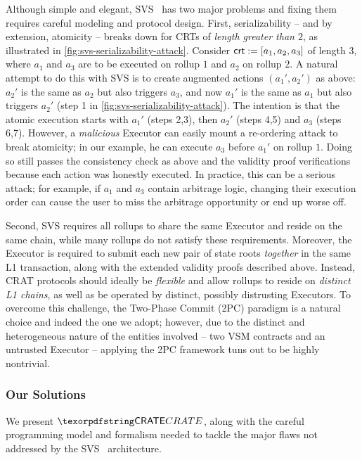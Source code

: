 Although simple and elegant, SVS~\cite{shared-val-seq-23} has two major problems and fixing them requires careful modeling and protocol design. 
First, serializability -- and by extension, atomicity -- breaks down for CRTs of \emph{length greater than $2$}, as illustrated in \cref{fig:svs-serializability-attack}.
Consider $\mathsf{crt} := [a_1, a_2, a_3]$ of length $3$, where $a_1$ and $a_3$ are to be executed on rollup $1$ and $a_2$ on rollup $2$. A natural attempt to do this with SVS is to create augmented actions $(a_1', a_2')$ as above: $a_2'$ is the same as $a_2$ but also triggers $a_3$, and now $a_1'$ is the same as $a_1$ but also triggers $a_2'$ (step 1 in \cref{fig:svs-serializability-attack}).
The intention is that the atomic execution starts with $a_1'$ (steps 2,3), then $a_2'$ (steps 4,5) and $a_3$ (steps 6,7). 
However, a \textit{malicious} Executor can easily mount a re-ordering attack to break atomicity; in our example, he can execute $a_3$ before $a_1'$ on rollup $1$. 
Doing so still passes the consistency check as above and the validity proof verifications because each action was honestly executed. In practice, this can be a serious attack; for example, if $a_1$ and $a_3$ contain arbitrage logic, changing their execution order can cause the user to miss the arbitrage opportunity or end up worse off. 








Second, SVS requires all rollups to share the same Executor and reside on the same chain, while many rollups do not satisfy these requirements. Moreover, the Executor is required to submit each new pair of state roots \emph{together} in the same L1 transaction, along with the extended validity proofs described above. Instead, CRAT protocols should ideally be \textit{flexible} and allow rollups to reside on \textit{distinct L1 chains}, as well as be operated by distinct, possibly distrusting Executors.
To overcome this challenge, the Two-Phase Commit (2PC) paradigm is a natural choice and indeed the one we adopt; however, due to the distinct and heterogeneous nature of the entities involved -- two VSM contracts and an untrusted Executor -- applying the 2PC framework tuns out to be highly nontrivial. 

\subsubsection{Our Solutions}
We present $\pname$, along with the careful programming model and formalism needed to tackle the major flaws not addressed by the SVS~\cite{shared-val-seq-23} architecture. 

